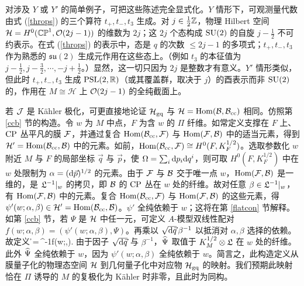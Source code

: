 对涉及 $Y$ 或 $Y'$ 的简单例子，可把这些陈述完全显式化。$Y$ 情形下，可观测量代数由式 (\ref{throps}) 的三个算符 $t_+,t_-,t_3$ 生成。对 $j\in\frac12{\mathbb Z}$，物理 Hilbert 空间 ${\mathcal H}=H^0({\mathbb{CP}}^1,{\mathcal O}(2j-1))$ 的维数为 $2j$；这 $2j$ 个态构成 ${\mathrm{SU}}(2)$ 的自旋 $j-\frac12$ 不可约表示。在式 (\ref{throps}) 的表示中，态是 $q$ 的次数 $\le 2j-1$ 的多项式；$t_+,t_-,t_3$ 作为熟悉的 $\mathfrak{su}(2)$ 生成元作用在这些态上。（例如 $t_3$ 的本征值为 $j-\frac12,j-\frac32,\cdots,-j+\frac12$。）显然，这一切只因为 $2j$ 是整数才有意义。$Y'$ 情形类似，但此时 $t_+,t_-,t_3$ 生成 ${\mathrm{PSL}}(2,{\mathbb R})$（或其覆盖群，取决于 $j$）的酉表示而非 ${\mathrm{SU}}(2)$ 的，作用在 $M\cong\mathcal H$ 上 ${\mathcal O}(2j-1)$ 的全纯截面上。

若 ${\mathcal J}$ 是 Kähler 极化，可更直接地论证 ${\mathcal H}_{\mathrm{gq}}$ 与 ${\mathcal H}={\mathrm{Hom}}({\mathcal B},{\mathcal B}_{\mathrm{cc}})$ 相同。仿照第 \ref{ccb} 节的构造。令 $w$ 为 $M$ 中点，$F$ 为含 $w$ 的 $\varPi$ 纤维。如常定义支撑在 $F$ 上、${\mathrm{CP}}$ 丛平凡的膜 ${\mathcal F}$，并通过复合 ${\mathrm{Hom}}({\mathcal B}_{\mathrm{cc}},{\mathcal F})$ 与 ${\mathrm{Hom}}({\mathcal F},{\mathcal B})$ 中的适当元素，得到 ${\mathcal H}'={\mathrm{Hom}}({\mathcal B}_{\mathrm{cc}},{\mathcal B})$ 中的元素。如前，${\mathrm{Hom}}({\mathcal B}_{\mathrm{cc}},{\mathcal F})\cong H^0(F,K_F^{1/2})$。选取参数化 $w$ 附近 $M$ 与 $F$ 的局部坐标 $\vec q$ 与 $\vec p$，使 $\Omega=\sum_i{\mathrm d} p_i{\mathrm d} q^i$，则可取 $H^0(F,K_F^{1/2})$ 中在 $w$ 处限制为 $\alpha=({\mathrm d}\vec p)^{1/2}$ 的元素。由于 ${\mathcal F}$ 与 ${\mathcal B}$ 交于唯一点 $w$，${\mathrm{Hom}}({\mathcal F},{\mathcal B})$ 是一维的，是 ${\mathfrak L}^{-1}|_w$ 的拷贝，即 ${\mathcal B}$ 的 ${\mathrm{CP}}$ 丛在 $w$ 处的纤维。故对任意 $\beta\in{\mathfrak L}^{-1}|_w$，有 ${\mathrm{Hom}}({\mathcal F},{\mathcal B})$ 中的元素。复合 ${\mathrm{Hom}}({\mathcal B}_{\mathrm{cc}},{\mathcal F})$ 与 ${\mathrm{Hom}}({\mathcal F},{\mathcal B})$ 的这些元素，得 $\psi'(w;\alpha,\beta)\in{\mathcal H}'={\mathrm{Hom}}({\mathcal B}_{\mathrm{cc}},{\mathcal B})$。$\psi'$ 全纯依赖于 $w$；这将在第 \ref{flatcon} 节解释。如第 \ref{ccb} 节，若 $\Psi$ 是 ${\mathcal H}$ 中任一元，可定义 $A$-模型双线性配对 $f(w;\alpha,\beta)=(\psi'(w;\alpha,\beta),\Psi)$。再乘以 $\sqrt{{\mathrm d}\vec q}\,\beta^{-1}$ 以抵消对 $\alpha,\beta$ 选择的依赖。故定义
\be\label{zofo}\h\Psi=\,\beta^{-1}f(w;\alpha,\beta). \ee
由于因子 $\sqrt{{\mathrm d}\vec q}$ 与 $\beta^{-1}$，$\widehat\Psi$ 取值于 $K_M^{1/2}\otimes{\mathfrak L}$ 在 $w$ 处的纤维。此外 $\widehat\Psi$ 全纯依赖于 $w$，因为 $\psi'(w;\alpha,\beta)$ 全纯依赖于 $w$。简言之，此构造定义从膜量子化的物理态空间 ${\mathcal H}$ 到几何量子化中对应物 ${\mathcal H}_{\mathrm{gq}}$ 的映射。我们预期此映射恰在 $\varPi$ 诱导的 $M$ 的复极化为 Kähler 时非零，且此时为同构。

